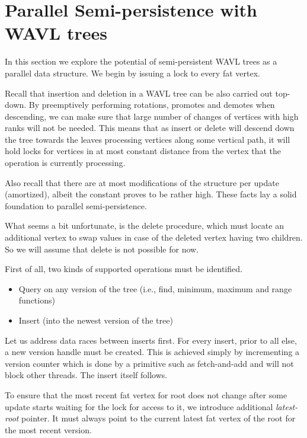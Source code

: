 \section{Parallel Semi-persistence with WAVL trees}

In this section we explore the potential of semi-persistent WAVL trees as a parallel data structure. 
We begin by issuing a lock to every fat vertex.

Recall that insertion and deletion in a WAVL tree can be also carried out top-down.
By preemptively performing rotations, promotes and demotes when descending, we can make sure that large number of changes of vertices with high ranks will not be needed. This means that as insert or delete will descend down the tree towards the leaves processing vertices along some vertical path, it will hold locks for vertices in at most constant distance from the vertex that the operation is currently processing.

Also recall that there are at most  modifications of the structure per update (amortized), albeit the constant proves to be rather high. These facts lay a solid foundation to parallel semi-persistence.

What seems a bit unfortunate, is the delete procedure, which must locate an additional vertex to swap values in case of the deleted vertex having two children. So we will assume that delete is not possible for now.

First of all, two kinds of supported operations must be identified. 

\begin{itemize}
	\item Query on any version of the tree (i.e., find, minimum, maximum and range functions)
	\item Insert (into the newest version of the tree)
\end{itemize}

Let us address data races between inserts first. For every insert, prior to all else, a new version handle must be created. This is achieved simply by incrementing a version counter which is done by a primitive such as fetch-and-add and will not block other threads. The insert itself follows.

To ensure that the most recent fat vertex for root does not change after some update starts waiting for the lock for access to it, we introduce additional \emph{latest-root} pointer. It must always point to the current latest fat vertex of the root for the most recent version. 

